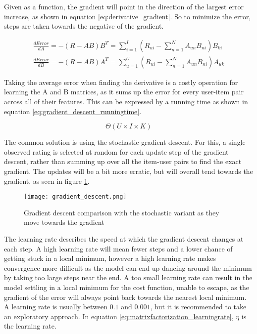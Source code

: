 Given as a function, the gradient will point in the direction of the largest error increase, as shown in equation \ref{eq:derivative_gradient}. So to minimize the error, steps are taken towards the negative of the gradient.

\begin{equation}\label{eq:derivative_gradient}
	\begin{split}
	\frac{dError}{dA}=-(R-AB)B^T = \sum_{i=1}^{I}(R_{ui} - \sum_{n=1}^{N} A_{un}B_{ni})B_{ki}
	\\
	\frac{dError}{dB}=-(R-AB)A^T = \sum_{u=1}^{U}(R_{ui} - \sum_{n=1}^{N} A_{un}B_{ni})A_{uk}
	\end{split}
\end{equation}

Taking the average error when finding the derivative is a costly operation for learning the A and B matrices, as it sums up the error for every user-item pair across all of their features. This can be expressed by a running time as shown in equation \ref{eq:gradient_descent_runningtime}.

\begin{equation}\label{eq:gradient_descent_runningtime}
	\Theta(U\times I \times K)
\end{equation}

The common solution is using the stochastic gradient descent. For this, a single observed rating is selected at random for each update step of the gradient descent, rather than summing up over all the item-user pairs to find the exact gradient. The updates will be a bit more erratic, but will overall tend towards the gradient, as seen in figure \ref{fig:gradient_descent}.

\begin{figure}\label{fig:gradient_descent}
	\centering
	\texttt{[image: gradient\_descent.png]}
	\caption{Gradient descent comparison with the stochastic variant as they move towards the gradient}
\end{figure}

The learning rate describes the speed at which the gradient descent changes at each step. A high learning rate will mean fewer steps and a lower chance of getting stuck in a local minimum, however a high learning rate makes convergence more difficult as the model can end up dancing around the minimum by taking too large steps near the end. A too small learning rate can result in the model settling in a local minimum for the cost function, unable to escape, as the gradient of the error will always point back towards the nearest local minimum. A learning rate is usually between $0.1$ and $0.001$, but it is recommended to take an exploratory approach. In equation \ref{eq:matrixfactorization_learningrate}, $\eta$ is the learning rate.

